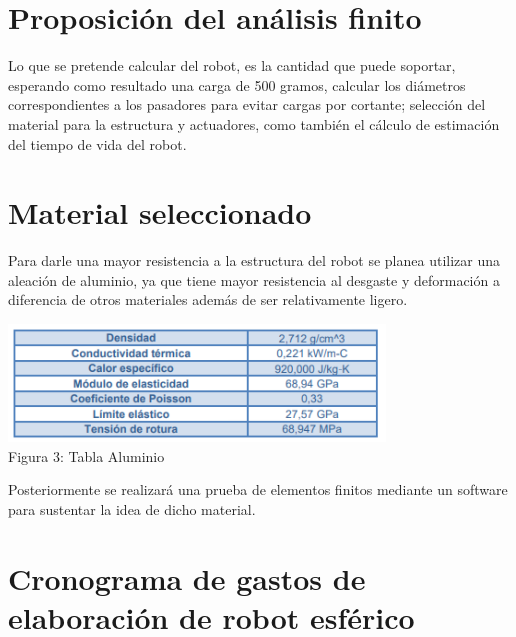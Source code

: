 \documentclass[11pt,a4paper,oldfontcommands,oneside]{memoir}
\begin{document}
\section{Proposición del análisis finito}
Lo que se pretende calcular del robot, es la cantidad que puede soportar, esperando como resultado una carga de 500 gramos, calcular los diámetros correspondientes a los pasadores para evitar cargas por cortante; selección del material para la estructura y actuadores, como también el cálculo de estimación del tiempo de vida del robot.\\

\section{Material seleccionado}

Para darle una mayor resistencia a la estructura del robot se planea utilizar una aleación de aluminio, ya que tiene mayor resistencia al desgaste y deformación a diferencia de otros materiales además de ser relativamente ligero.\\


\begin{center}
\includegraphics[width=10cm]{tablaaluminio.png}
 \\
 Figura 3: Tabla Aluminio
\end{center}
Posteriormente se realizará una prueba de elementos finitos mediante un software para sustentar la idea de dicho material.\\

\section{Cronograma de gastos de elaboración de robot esférico}
 
\end{document}
